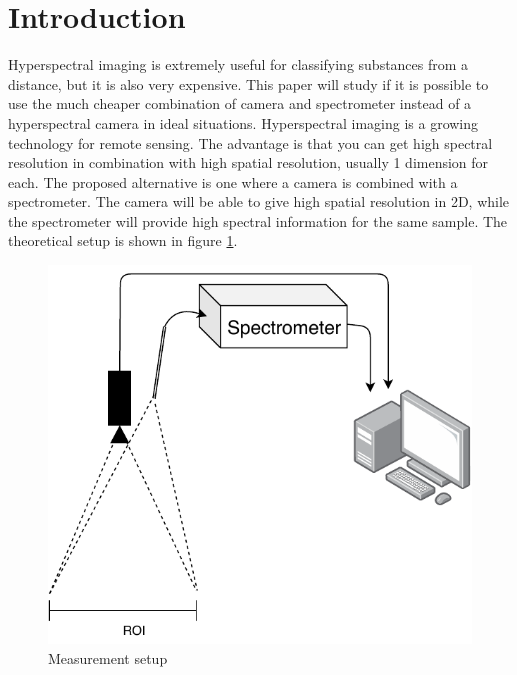 \section{Introduction}
Hyperspectral imaging is extremely useful for classifying substances from a distance, but it is also very expensive. This paper will study if it is possible to use the much cheaper combination of camera and spectrometer instead of a hyperspectral camera in ideal situations. 
Hyperspectral imaging is a growing technology for remote sensing. The advantage is that you can get high spectral resolution in combination with high spatial resolution, usually 1 dimension for each. The proposed alternative is one where a camera is combined with a spectrometer. The camera will be able to give high spatial resolution in 2D, while the spectrometer will provide high spectral information for the same sample. The theoretical setup is shown in figure \ref{fig:measurement_setup}. 


\begin{figure}[h]
    \centering
    \includegraphics[width=1\textwidth]{figures/pt_setup.pdf}
    \caption{Measurement setup}
    \label{fig:measurement_setup}
\end{figure}

